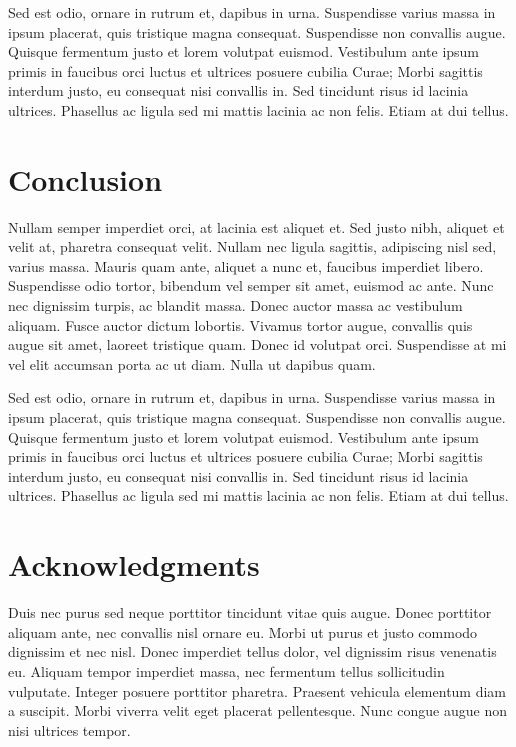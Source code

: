 \documentclass[fleqn,10pt]{JLA_article} %
\begin{document}
Sed est odio, ornare in rutrum et, dapibus in urna. Suspendisse varius massa in ipsum placerat, quis tristique magna consequat. Suspendisse non convallis augue. Quisque fermentum justo et lorem volutpat euismod. Vestibulum ante ipsum primis in faucibus orci luctus et ultrices posuere cubilia Curae; Morbi sagittis interdum justo, eu consequat nisi convallis in. Sed tincidunt risus id lacinia ultrices. Phasellus ac ligula sed mi mattis lacinia ac non felis. Etiam at dui tellus.

\hypertarget{conclusion}{%
\section{Conclusion}\label{conclusion}}

Nullam semper imperdiet orci, at lacinia est aliquet et. Sed justo nibh, aliquet et velit at, pharetra consequat velit. Nullam nec ligula sagittis, adipiscing nisl sed, varius massa. Mauris quam ante, aliquet a nunc et, faucibus imperdiet libero. Suspendisse odio tortor, bibendum vel semper sit amet, euismod ac ante. Nunc nec dignissim turpis, ac blandit massa. Donec auctor massa ac vestibulum aliquam. Fusce auctor dictum lobortis. Vivamus tortor augue, convallis quis augue sit amet, laoreet tristique quam. Donec id volutpat orci. Suspendisse at mi vel elit accumsan porta ac ut diam. Nulla ut dapibus quam.

Sed est odio, ornare in rutrum et, dapibus in urna. Suspendisse varius massa in ipsum placerat, quis tristique magna consequat. Suspendisse non convallis augue. Quisque fermentum justo et lorem volutpat euismod. Vestibulum ante ipsum primis in faucibus orci luctus et ultrices posuere cubilia Curae; Morbi sagittis interdum justo, eu consequat nisi convallis in. Sed tincidunt risus id lacinia ultrices. Phasellus ac ligula sed mi mattis lacinia ac non felis. Etiam at dui tellus.

\hypertarget{acknowledgments}{%
\section*{Acknowledgments}\label{acknowledgments}}

Duis nec purus sed neque porttitor tincidunt vitae quis augue. Donec porttitor aliquam ante, nec convallis nisl ornare eu. Morbi ut purus et justo commodo dignissim et nec nisl. Donec imperdiet tellus dolor, vel dignissim risus venenatis eu. Aliquam tempor imperdiet massa, nec fermentum tellus sollicitudin vulputate. Integer posuere porttitor pharetra. Praesent vehicula elementum diam a suscipit. Morbi viverra velit eget placerat pellentesque. Nunc congue augue non nisi ultrices tempor.
\end{document}
